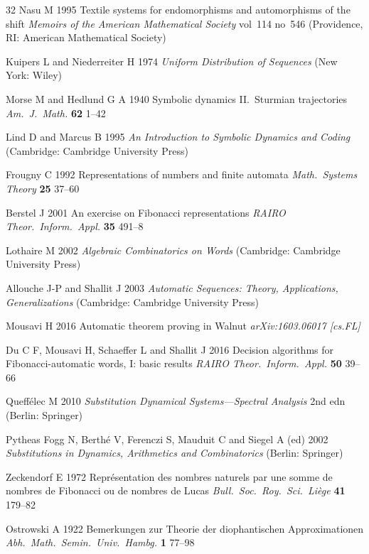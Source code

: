\begin{thebibliography}{32}
Nasu M 1995
Textile systems for endomorphisms and automorphisms of the shift
\textit{Memoirs of the American Mathematical Society} vol~114 no~546
(Providence, RI: American Mathematical Society)

Kuipers L and Niederreiter H 1974
\textit{Uniform Distribution of Sequences}
(New York: Wiley)

Morse M and Hedlund G A 1940
Symbolic dynamics II.\ Sturmian trajectories
\textit{Am.\ J.\ Math.} \textbf{62} 1--42

Lind D and Marcus B 1995
\textit{An Introduction to Symbolic Dynamics and Coding}
(Cambridge: Cambridge University Press)

Frougny C 1992
Representations of numbers and finite automata
\textit{Math.\ Systems Theory} \textbf{25} 37--60

Berstel J 2001
An exercise on Fibonacci representations
\textit{RAIRO Theor.\ Inform.\ Appl.} \textbf{35} 491--8

Lothaire M 2002
\textit{Algebraic Combinatorics on Words}
(Cambridge: Cambridge University Press)

Allouche J-P and Shallit J 2003
\textit{Automatic Sequences: Theory, Applications, Generalizations}
(Cambridge: Cambridge University Press)

Mousavi H 2016
Automatic theorem proving in Walnut
\textit{arXiv:1603.06017 [cs.FL]}

Du C F, Mousavi H, Schaeffer L and Shallit J 2016
Decision algorithms for Fibonacci-automatic words, I: basic results
\textit{RAIRO Theor.\ Inform.\ Appl.} \textbf{50} 39--66

Queff\'elec M 2010
\textit{Substitution Dynamical Systems---Spectral Analysis} 2nd edn
(Berlin: Springer)

Pytheas Fogg N, Berth\'e V, Ferenczi S, Mauduit C and Siegel A (ed) 2002
\textit{Substitutions in Dynamics, Arithmetics and Combinatorics}
(Berlin: Springer)

Zeckendorf E 1972
Repr\'esentation des nombres naturels par une somme de nombres de Fibonacci ou de nombres de Lucas
\textit{Bull.\ Soc.\ Roy.\ Sci.\ Li\`ege} \textbf{41} 179--82

Ostrowski A 1922
Bemerkungen zur Theorie der diophantischen Approximationen
\textit{Abh.\ Math.\ Semin.\ Univ.\ Hambg.} \textbf{1} 77--98


\end{thebibliography}
